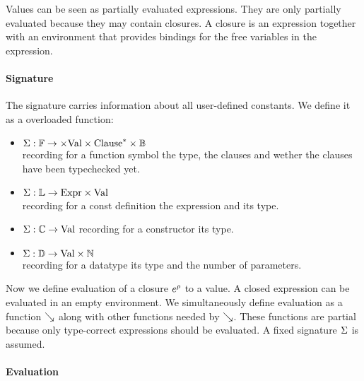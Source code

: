 Values can be seen as partially evaluated expressions.
They are only partially evaluated because they may contain closures.
A closure is an expression together with an environment that provides bindings for the free variables in the expression.
\paragraph*{Signature}
The signature carries information about all user-defined constants.
We define it as a overloaded function:
\begin{itemize}
\item
$ \mathrm{\Sigma} : \mathbb{F} \rightarrow \times \mathrm{Val} \times {\mathrm{Clause}}^{\ast} \times \mathbb{B} $\\
recording for a function symbol the type, the clauses and wether the clauses have been typechecked yet.
\item
$ \mathrm{\Sigma} : \mathbb{L} \rightarrow \mathrm{Expr} \times \mathrm{Val} $ \\
recording for a const definition the expression and its type. 
\item
$ \mathrm{\Sigma} : \mathbb{C} \rightarrow \mathrm{Val} $
recording for a constructor its type.
\item
$ \mathrm{\Sigma} : \mathbb{D} \rightarrow \mathrm{Val} \times \mathbb{N} $\\
recording for a datatype its type and the number of parameters.
\end{itemize}

Now we define evaluation of a closure $e^{\rho}$ to a value. 
A closed expression can be evaluated in an empty environment.
We simultaneously define evaluation as a function $\searrow$ along with other functions needed by $\searrow$.     
These functions are partial because only type-correct expressions should be evaluated.
A fixed signature $\mathrm{\Sigma}$ is assumed.

\paragraph*{Evaluation}

